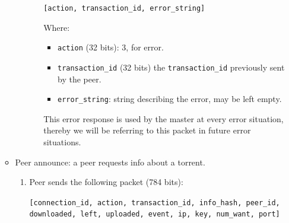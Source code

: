\documentclass[twoside,a4paper,10pt]{article}
\begin{document}
\begin{itemize}
\begin{itemize}
\begin{enumerate}
\begin{enumerate}
        \texttt{[action, transaction\_id, error\_string]} 

        Where:
        \begin{itemize}
        \item \texttt{action} (32 bits): 3, for error.
        \item \texttt{transaction\_id} (32 bits)
          the \texttt{transaction\_id} previously sent by the peer.
        \item \texttt{error\_string}: string describing the error, may be left
          empty.
        \end{itemize}

        This error response is used by the master at every error situation,
        thereby we will be referring to this packet in future error situations.
        
      \end{enumerate}
    \end{enumerate}

  \item Peer announce: a peer requests info about a torrent.
    \begin{enumerate}
    \item Peer sends the following packet (784 bits):

      \texttt{[connection\_id, action, transaction\_id, info\_hash, peer\_id,
          downloaded, left, uploaded, event, ip, key, num\_want, port]}


\end{enumerate}
\end{itemize}
\end{itemize}
\end{document}
